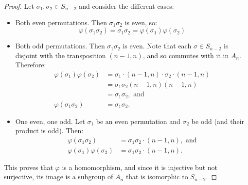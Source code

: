 \documentclass{article}
\begin{document}
\begin{proof}
    Let $\sigma_1, \sigma_2 \in S_{n - 2}$ and consider the different cases:
    \begin{itemize}[itemsep=0em]
        \item Both even permutations. Then $\sigma_1 \sigma_2$ is even, so:
              \begin{equation*}
                \varphi(\sigma_1 \sigma_2) = \sigma_1 \sigma_2 = \varphi(\sigma_1) \varphi(\sigma_2)
              \end{equation*}
        \item Both odd permutations. Then $\sigma_1 \sigma_2$ is even. Note that each $\sigma \in S_{n - 2}$ is disjoint with the transposition $(n - 1, n)$, and so commutes with it in $A_n$. Therefore:
              \begin{align*}
                  \varphi(\sigma_1) \varphi(\sigma_2) &= \sigma_1 \cdot (n - 1, n) \cdot \sigma_2 \cdot (n - 1, n) \\ &= \sigma_1 \sigma_2 (n - 1, n)(n - 1, n) \\
                  &= \sigma_1 \sigma_2, \text{ and} \\
                  \varphi(\sigma_1 \sigma_2) &= \sigma_1 \sigma_2.
              \end{align*}
        \item One even, one odd. Let $\sigma_1$ be an even permutation and $\sigma_2$ be odd (and their product is odd). Then:
              \begin{align*}
                \varphi(\sigma_1 \sigma_2) &= \sigma_1 \sigma_2 \cdot (n - 1, n), \text{ and} \\
                \varphi(\sigma_1) \varphi(\sigma_2) &= \sigma_1 \sigma_2 \cdot (n - 1, n).
              \end{align*}
    \end{itemize}
    This proves that $\varphi$ is a homomorphism, and since it is injective but not surjective, its image is a subgroup of $A_n$ that is isomorphic to $S_{n - 2}$.
\end{proof}
\end{document}

